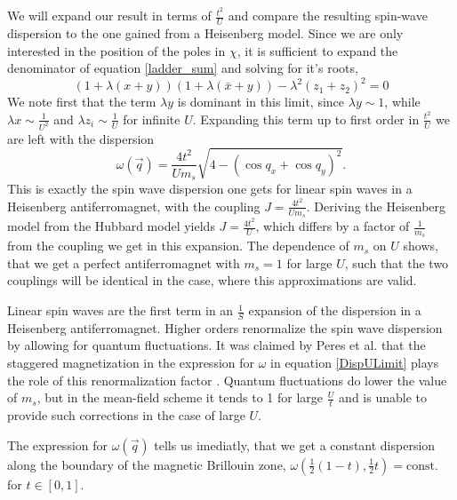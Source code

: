 \documentclass[a4paper,12pt]{report}
\begin{document}
%
%

We will expand our result in terms of $\frac{t^2}{U}$ and compare the resulting spin-wave dispersion to the one gained from a Heisenberg model.
Since we are only interested in the position of the poles in $\chi$, it is sufficient to expand the denominator of equation \ref{ladder_sum} and solving for it's roots,
\begin{equation}
 \left(1+\lambda(x+y)\right)\left(1+\lambda(\bar x + y)\right) - \lambda^2(z_1 +z_2)^2 = 0
\end{equation}
We note first that the term $\lambda y$ is dominant in this limit, since $\lambda y \sim 1$, while $\lambda x \sim \frac1{U^2}$ and $\lambda z_i \sim \frac1U$
for infinite $U$.
Expanding this term
up to first order in  $\frac{t^2}U$ we are left with the dispersion
\begin{equation}\label{DispULimit}
 \omega(\vec q) = \frac{4t^2}{Um_s}\sqrt{4-(\cos q_x+\cos q_y)^2}. 
\end{equation}
This is exactly the spin wave dispersion one gets for linear spin waves in a Heisenberg antiferromagnet, 
with the coupling $J=\frac{4t^2}{Um_s}$.
Deriving the Heisenberg model from the Hubbard model yields $J=\frac{4t^2}{U}$, which differs by a factor of $\frac1{m_s}$ from the coupling we get in this expansion.
The dependence of $m_s$ on $U$ shows, that we get a perfect antiferromagnet with $m_s=1$ for large $U$, 
such that the two couplings will be identical in the case, where this approximations are valid. 
%

Linear spin waves are the first term in an $\frac1S$ expansion of the dispersion in a Heisenberg antiferromagnet.
Higher orders renormalize the spin wave dispersion by allowing for quantum fluctuations.
It was claimed by Peres et al. that the staggered magnetization in the expression for $\omega$ in equation \ref{DispULimit} 
plays the role of this renormalization factor \cite{PhysRevB.65.132404}.
Quantum fluctuations do lower the value of $m_s$, but in the mean-field scheme it tends to 1 for large $\frac Ut$ 
and is unable to provide such corrections in the case of large $U$.

The expression for $\omega(\vec q)$ tells us imediatly, that we get a constant dispersion along the 
boundary of the magnetic Brillouin zone, $\omega(\frac12(1-t), \frac12t) =\mathrm{const.}$ for $t \in [0,1]$.
\end{document}

